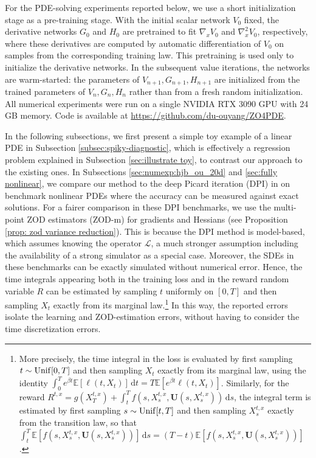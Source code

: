 \documentclass[twoside,11pt]{article}
\newcommand{\dd}{\mathrm{d}}
\newcommand{\E}{\mathbb{E}}
\newcommand{\1}{\mathbf{1}}
\numberwithin{equation}{section}
\begin{document}
For the PDE-solving experiments reported below, we use a short initialization stage as a pre-training stage. With the initial scalar network $V_0$ fixed, the derivative networks $G_0$ and $H_0$ are pretrained to fit $\nabla_x V_0$ and $\nabla_x^2 V_0$, respectively, where these derivatives are computed by automatic differentiation of $V_0$ on samples from the corresponding training law. This pretraining is used only to initialize the derivative networks. In the subsequent value iterations, the networks are warm-started: the parameters of $V_{n+1}, G_{n+1}, H_{n+1}$ are initialized from the trained parameters of $V_n,G_n,H_n$ rather than from a fresh random initialization. All numerical experiments were run on a single NVIDIA RTX 3090 GPU with 24 GB memory. Code is available at \url{https://github.com/du-ouyang/ZO4PDE}.




In the following subsections, we first present a simple toy example of a linear PDE in Subsection \ref{subsec:spiky-diagnostic}, which is effectively a regression problem explained in Subsection \ref{sec:illustrate toy}, to contrast our approach to the
existing ones. In Subsections \ref{sec:numexp:hjb_ou_20d} and \ref{sec:fully nonlinear}, we compare our method to the deep Picard iteration (DPI) in \cite{han26} on benchmark nonlinear PDEs where the accuracy can be measured against exact solutions. For a fairer  comparison in these DPI benchmarks, we use the multi-point ZOD estimators (ZOD-m) for gradients and Hessians (see Proposition \ref{prop: zod variance reduction}). This is because the DPI method is model-based, which assumes knowing the operator $\mathcal L$, a much stronger assumption including the availability of a strong simulator as a special case. Moreover, the SDEs in these benchmarks can be exactly simulated without numerical error. Hence, the time integrals appearing both in the training loss and in the reward random variable $R$ can be estimated by sampling $t$ uniformly on $[0,T]$ and then sampling $X_t$ exactly from its marginal law.\footnote{
More precisely, the time integral in the loss is evaluated by first sampling \(t\sim{\rm Unif}[0,T]\) and then sampling \(X_t\) exactly from its marginal law, using the identity \(\int_0^T e^{\beta t}\E[\ell(t,X_t)]\,\dd t=T\E[e^{\beta t}\ell(t,X_t)]\). Similarly, for the reward \(R^{t,x}=g(X_T^{t,x})+\int_t^T f(s,X_s^{t,x},\mathbf U(s,X_s^{t,x}))\,\dd s\), the integral term is estimated by first sampling \(s\sim{\rm Unif}[t,T]\) and then sampling \(X_s^{t,x}\) exactly from the transition law, so that \(\int_t^T \E[f(s,X_s^{t,x},\mathbf U(s,X_s^{t,x}))]\,\dd s=(T-t)\E[f(s,X_s^{t,x},\mathbf U(s,X_s^{t,x}))]\).} In this way, the reported errors isolate the learning and ZOD-estimation errors, without having to consider the time discretization errors.
\end{document}
